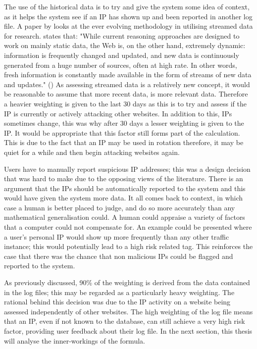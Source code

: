 The use of the historical data is to try and give the system some idea of context, as it helps the system see if an IP has shown up and been reported in another log file. A paper by \citeauthor{reiss2007efficient} looks at the ever evolving methodology in utilising streamed data for research. \citeauthor{reiss2007efficient} states that: "While current reasoning approaches are designed to work on mainly static data, the Web is, on the other hand, extremely dynamic: information is frequently changed and updated, and new data is continuously generated from a huge number of sources, often at high rate. In other words, fresh information is constantly made available in the form of streams of new data and updates." (\cite{reiss2007efficient}) As assessing streamed data is a relatively new concept, it would be reasonable to assume that more recent data, is more relevant data. Therefore a heavier weighting is given to the last 30 days as this is to try and assess if the IP is currently or actively attacking other websites. In addition to this, IPs sometimes change, this was why after 30 days a lesser weighting is given to the IP. It would be appropriate that this factor still forms part of the calculation. This is due to the fact that an IP may be used in rotation therefore, it may be quiet for a while and then begin attacking websites again. 

Users have to manually report suspicious IP addresses; this was a design decision that was hard to make due to the opposing views of the literature. There is an argument that the IPs should be automatically reported to the system and this would have given the system more data. It all comes back to context, in which case a human is better placed to judge, and do so more accurately than any mathematical generalisation could. A human could appraise a variety of factors that a computer could not compensate for. An example could be presented where a user's personal IP would show up more frequently than any other traffic instance; this would potentially lead to a high risk related tag. This reinforces the case that there was the chance that non malicious IPs could be flagged and reported to the system. 

As previously discussed, 90\% of the weighting is derived from the data contained in the log files; this may be regarded as a particularly heavy weighting. The rational behind this decision was due to the IP activity on a website being assessed independently of other websites. The high weighting of the log file means that an IP, even if not known to the database, can still achieve a very high risk factor, providing user feedback about their log file. In the next section, this thesis will analyse the inner-workings of the formula.

